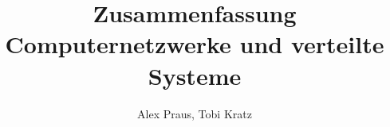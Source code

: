 \documentclass[
	ngerman,
	accentcolor=9c,%
	type=intern,
	marginpar=false
	]{tudapub}
\begin{document}
\title{Zusammenfassung Computernetzwerke und verteilte Systeme}
\author{Alex Praus, Tobi Kratz}

\maketitle

\tableofcontents






\end{document}
